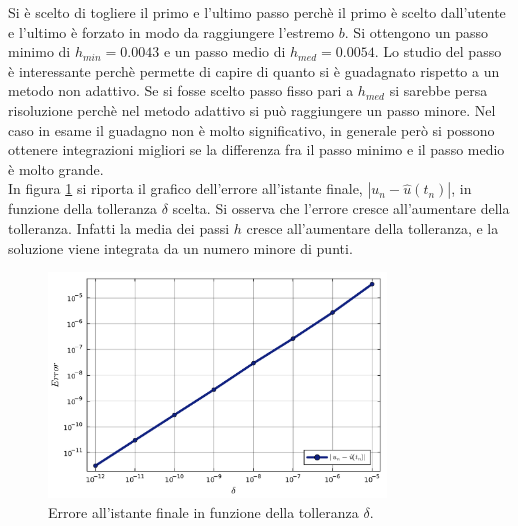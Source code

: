 \documentclass[letterpaper, 12pt]{article}
\numberwithin{equation}{section}    %
\begin{document}
Si è scelto di togliere il primo e l'ultimo passo perchè il primo è scelto dall'utente e l'ultimo
è forzato in modo da raggiungere l'estremo $b$. Si ottengono
un passo minimo di $h_{min} = 0.0043$ e un passo medio di $h_{med} = 0.0054$. Lo studio del passo è interessante
perchè permette di capire di quanto si è guadagnato rispetto a un metodo non adattivo. Se si fosse
scelto passo fisso pari a $h_{med}$ si sarebbe persa risoluzione perchè nel metodo adattivo
si può raggiungere un passo minore. Nel caso in esame il guadagno non è molto significativo, in generale però
si possono ottenere integrazioni migliori se la differenza fra il passo minimo e il passo medio è molto grande. \\
In figura \ref{fig:es6_3_5_2} si riporta il grafico dell'errore all'istante finale,
$|u_n-\hat{u}(t_n)|$, in funzione della tolleranza $\delta$ scelta. Si osserva che l'errore cresce all'aumentare
della tolleranza. Infatti la media dei passi $h$ cresce all'aumentare della tolleranza, e la soluzione 
viene integrata da un numero minore di punti.
\begin{figure}[!ht]
    \centering
    \includegraphics[width=0.8\textwidth]{6353.pdf}
    \caption{Errore all'istante finale in funzione della tolleranza $\delta$.}
    \label{fig:es6_3_5_2}
\end{figure}
\end{document}
